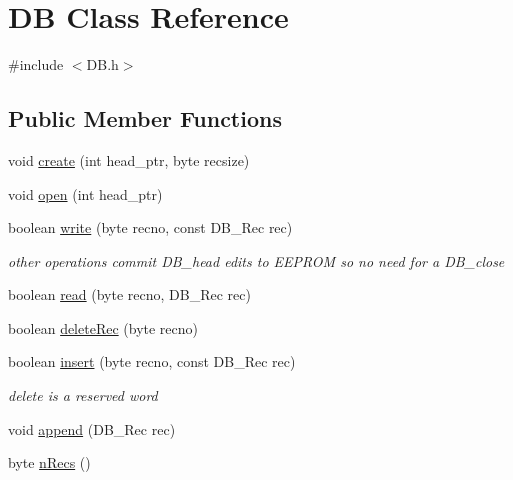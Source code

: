 \hypertarget{class_d_b}{}\section{D\+B Class Reference}
\label{class_d_b}


{\ttfamily \#include $<$D\+B.\+h$>$}

\subsection*{Public Member Functions}
\begin{DoxyCompactItemize}
\item 
void \hyperlink{class_d_b_a8b127e880450d59edb44917b649e208a}{create} (int head\+\_\+ptr, byte recsize)
\item 
void \hyperlink{class_d_b_ad33976298894f7c9c8eebcaf5690e077}{open} (int head\+\_\+ptr)
\item 
\hypertarget{class_d_b_ab575dabea1a7ff1a34f835c7af8909b6}{}boolean \hyperlink{class_d_b_ab575dabea1a7ff1a34f835c7af8909b6}{write} (byte recno, const D\+B\+\_\+\+Rec rec)\label{class_d_b_ab575dabea1a7ff1a34f835c7af8909b6}

\begin{DoxyCompactList}\small\item\em other operations commit D\+B\+\_\+head edits to E\+E\+P\+R\+O\+M so no need for a D\+B\+\_\+close \end{DoxyCompactList}\item 
boolean \hyperlink{class_d_b_a85ebaffa1ab1c52e0f1ae24aacffd05c}{read} (byte recno, D\+B\+\_\+\+Rec rec)
\item 
boolean \hyperlink{class_d_b_a777b6433246a05542618225e9dfbf151}{delete\+Rec} (byte recno)
\item 
\hypertarget{class_d_b_a0b8ac18ac0d0b5ffccf8906bc7d1abc3}{}boolean \hyperlink{class_d_b_a0b8ac18ac0d0b5ffccf8906bc7d1abc3}{insert} (byte recno, const D\+B\+\_\+\+Rec rec)\label{class_d_b_a0b8ac18ac0d0b5ffccf8906bc7d1abc3}

\begin{DoxyCompactList}\small\item\em delete is a reserved word \end{DoxyCompactList}\item 
void \hyperlink{class_d_b_ade253f950a1ff2dc945fd19eaf54dfbc}{append} (D\+B\+\_\+\+Rec rec)
\item 
byte \hyperlink{class_d_b_ac25d62bf0647d3c13e2d674235214b04}{n\+Recs} ()
\end{DoxyCompactItemize}
